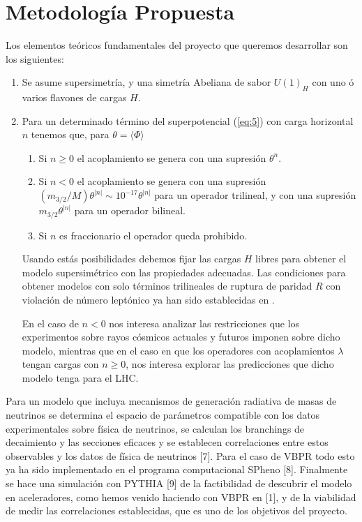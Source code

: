 \section{ Metodología Propuesta }

Los elementos teóricos fundamentales del proyecto que queremos desarrollar
son los siguientes:

\begin{enumerate}
\item Se asume supersimetría, y una simetría Abeliana de sabor $U(1)_H$ con uno ó varios flavones de cargas $H$.

\item Para un determinado término del superpotencial (\ref{eq:5}) con carga horizontal $n$ tenemos que, para $\theta=\langle\Phi\rangle$
  \begin{enumerate}
  \item Si $n\ge 0$ el acoplamiento se genera con una supresión $\theta^n$.
  \item Si $n<0$ el acoplamiento se genera con una supresión $(m_{3/2}/M)\theta^{|n|}\sim 10^{-17}\theta^{|n|}$ para un operador trilineal, y con una supresión $m_{3/2}\theta^{|n|}$ para un operador bilineal.
  \item Si $n$ es fraccionario el operador queda prohibido.
  \end{enumerate}
Usando estás posibilidades debemos fijar las cargas $H$ libres para obtener el modelo supersimétrico con las propiedades adecuadas. Las condiciones para obtener modelos con solo términos trilineales de ruptura de paridad $R$ con violación de número leptónico ya han sido establecidas en \cite{Sierra:2009zq}.

 En el caso de $n<0$ nos interesa analizar las restricciones que los experimentos sobre rayos cósmicos actuales y futuros imponen sobre dicho modelo, mientras que en el caso en que los operadores con acoplamientos $\lambda$ tengan cargas con $n\ge 0$, nos interesa explorar las predicciones que dicho modelo tenga para el LHC.
\end{enumerate}

Para un modelo que incluya mecanismos de generación radiativa de masas de neutrinos se determina el espacio de parámetros compatible con los datos experimentales sobre física de neutrinos, se calculan los branchings de decaimiento y las secciones eficaces y se establecen correlaciones entre estos observables y los datos de física de neutrinos [7]. Para el caso de VBPR todo esto ya ha sido implementado en el programa computacional SPheno [8]. Finalmente se hace una simulación con PYTHIA [9] de la factibilidad de descubrir el modelo en aceleradores, como hemos venido haciendo con VBPR en [1], y de la viabilidad de medir las correlaciones establecidas, que es uno de los objetivos del proyecto.


